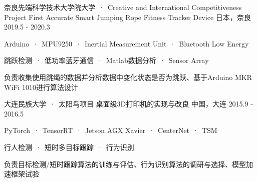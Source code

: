 

\begin{cventries}
  
  \cventryproject 
    {奈良先端科学技术大学院大学\ ·\ Creative and International Competitiveness Project}%
    {First Accurate Smart Jumping Rope Fitness Tracker Device} %
    {日本，奈良} %
    {2019.5 - 2020.3} %
    {
      \begin{cvitems} %
        \item {Arduino\ ·\ MPU9250\ ·\ Inertial Measurement Unit\ ·\ Bluetooth Low Energy}
        \item {跳跃检测\ ·\ 低功率蓝牙通信\ ·\ Matlab数据分析\ ·\ Sensor Array}
        \item {负责收集使用跳绳的数据并分析数据中变化状态是否为跳跃、基于Arduino MKR WiFi 1010进行算法设计}
      \end{cvitems}
    }
    
  \cventryproject 
    {大连民族大学\ ·\ 太阳鸟项目}%
    {桌面级3D打印机的实现与改良} %
    {中国，大连} %
    {2015.9 - 2016.5} %
    {
      \begin{cvitems} %
        \item {PyTorch\ ·\ TensorRT\ ·\ Jetson AGX Xavier\ ·\ CenterNet\ ·\ TSM}
        \item {行人检测\ ·\ 短时多目标跟踪\ ·\ 行为识别}
        \item {负责目标检测/短时跟踪算法的训练与评估、行为识别算法的调研与选择、模型加速框架试验}
      \end{cvitems}
    }

\end{cventries}